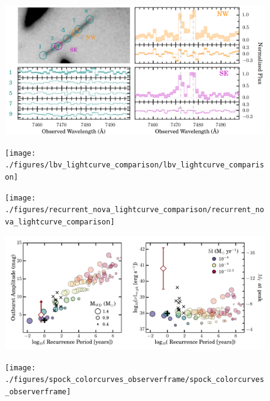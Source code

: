 \begin{figure}[tbp]
  \begin{center}
    \includegraphics[width=\textwidth]{./figures/muse_oii_sequence/muse_oii_sequence}
    \caption{\protect}
  \end{center}
\end{figure}

\begin{figure}[tbp]
  \begin{center}
    \texttt{[image: ./figures/lbv\_lightcurve\_comparison/lbv\_lightcurve\_comparison]}
    \caption{\protect}
  \end{center}
\end{figure}

\begin{figure}[tbp]
  \begin{center}
    \texttt{[image: ./figures/recurrent\_nova\_lightcurve\_comparison/recurrent\_nova\_lightcurve\_comparison]}
    \caption{\protect}
  \end{center}
\end{figure}

\begin{figure}[tbp]
  \begin{center}
    \includegraphics[width=\textwidth]{./figures/recurrent_nova_recurrence_comparison/recurrent_nova_recurrence_comparison}
    \caption{\protect}
  \end{center}
\end{figure}

\begin{figure}[tbp]
  \begin{center}
    \texttt{[image: ./figures/spock\_colorcurves\_observerframe/spock\_colorcurves\_observerframe]}
    \caption{\protect}
  \end{center}
\end{figure}

